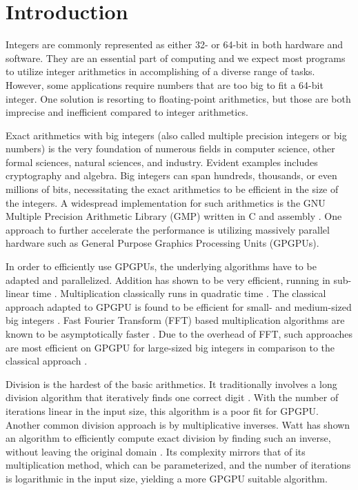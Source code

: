 \section{Introduction}
\label{sec:intro}

Integers are commonly represented as either 32- or 64-bit in both hardware and
software. They are an essential part of computing and we expect most programs to
utilize integer arithmetics in accomplishing of a diverse range of
tasks. However, some applications require numbers that are too big to fit a
64-bit integer. One solution is resorting to floating-point arithmetics, but
those are both imprecise and inefficient compared to integer arithmetics.

Exact arithmetics with big integers (also called multiple precision integers or
big numbers) is the very foundation of numerous fields in computer science,
other formal sciences, natural sciences, and industry. Evident examples includes
cryptography and algebra. Big integers can span hundreds, thousands, or even
millions of bits, necessitating the exact arithmetics to be efficient in the
size of the integers. A widespread implementation for such arithmetics is the
GNU Multiple Precision Arithmetic Library (GMP) written in C and assembly
\cite{GMP}. One approach to further accelerate the performance is utilizing
massively parallel hardware such as General Purpose Graphics Processing Units
(GPGPUs).

In order to efficiently use GPGPUs, the underlying algorithms have to be adapted
and parallelized. Addition has shown to be very efficient, running in sub-linear
time \cite{DPPproject,blellochaddscan}. Multiplication classically runs in
quadratic time \cite{knuth97}. The classical approach adapted to GPGPU is found
to be efficient for small- and medium-sized big integers
\cite{doi:10.1177/10943420221077964, oancea2024gpu}. Fast Fourier Transform
(FFT) based multiplication algorithms are known to be asymptotically faster
\cite{knuth97}. Due to the overhead of FFT, such approaches are most efficient
on GPGPU for large-sized big integers in comparison to the classical approach
\cite{Bantikyan2014BigIM, doi:10.1177/10943420221077964, oancea2024gpu}.

Division is the hardest of the basic arithmetics. It traditionally involves a
long division algorithm that iteratively finds one correct digit
\cite{knuth97}. With the number of iterations linear in the input size, this
algorithm is a poor fit for GPGPU. Another common division approach is by
multiplicative inverses. Watt has shown an algorithm to efficiently compute
exact division by finding such an inverse, without leaving the original domain
\cite{watt2023efficient}. Its complexity mirrors that of its multiplication
method, which can be parameterized, and the number of iterations is logarithmic
in the input size, yielding a more GPGPU suitable algorithm. \bigskip


